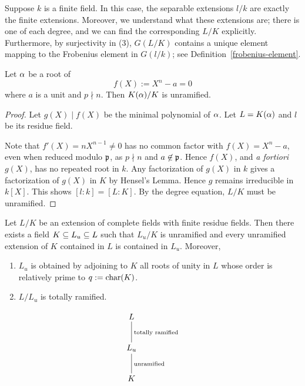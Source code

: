 Suppose $k$ is a finite field. In this case, the separable extensions $l/k$ are exactly the finite extensions. Moreover, we understand what these extensions are; there is one of each degree, and we can find the corresponding $L/K$ explicitly. Furthermore, by surjectivity in (3), $G(L/K)$ contains a unique element mapping to the Frobenius element in $G(l/k)$; see Definition~\ref{frobenius-element}.
\begin{lem}
Let $\alpha$ be a root of
\[
f(X):=X^n-a=0
\]
where $a$ is a unit and $p\nmid n$. Then $K(\alpha)/K$ is unramified.
\end{lem}
\begin{proof}
Let $g(X)\mid f(X)$ be the minimal polynomial of $\alpha$. Let $L=K(\alpha)$ and $l$ be its residue field.

Note that $f'(X)=nX^{n-1}\ne 0$ has no common factor with $f(X)=X^n-a$, even when reduced modulo $\mathfrak{p}$, as $p\nmid n$ and $a\not\in \mathfrak{p}$. Hence $f(X)$, and {\it a fortiori} $g(X)$, has no repeated root in $k$. Any factorization of $g(X)$ in $k$ gives a factorization of $g(X)$ in $K$ by Hensel's Lemma. Hence $g$ remains irreducible in $k[X]$. This shows $[l:k]=[L:K]$. By the degree equation, $L/K$ must be unramified.
\end{proof}
\begin{thm}
Let $L/K$ be an extension of complete fields with finite residue fields. Then %
there exists a field $K\subseteq L_u\subseteq L$ such that $L_u/K$ is unramified and every unramified extension of $K$ contained in $L$ is contained in $L_u$. Moreover,
\begin{enumerate}
\item
$L_u$ is obtained by adjoining to $K$ all roots of unity in $L$ whose order is relatively prime to $q:=\operatorname{char}(K)$.
\item $L/L_u$ is totally ramified.
\end{enumerate}
\[
\xymatrix{
L\ar@{-}[d]^{\text{totally ramified}}\\
L_u\ar@{-}[d]^{\text{unramified}}\\
K
}
\]
\end{thm}
